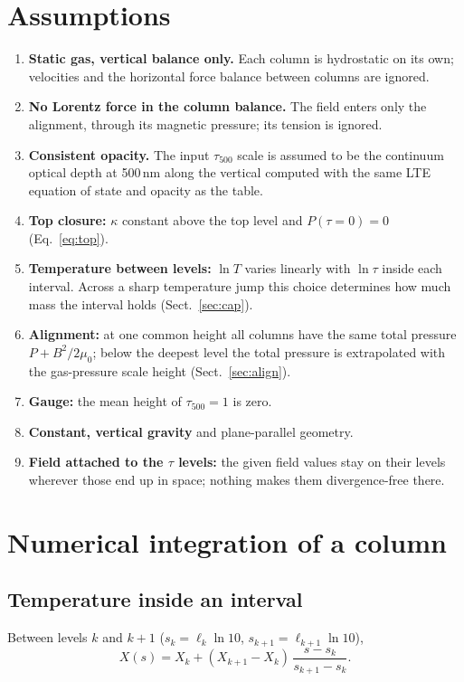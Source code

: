 \section{Assumptions}\label{sec:assume}
\begin{enumerate}[label=\textbf{A\arabic*.},leftmargin=2.2em]
\item \textbf{Static gas, vertical balance only.} Each column is hydrostatic on its own; velocities and the horizontal force
balance between columns are ignored.
\item \textbf{No Lorentz force in the column balance.} The field enters only the alignment, through its magnetic pressure;
its tension is ignored.
\item \textbf{Consistent opacity.} The input $\tau_{500}$ scale is assumed to be the continuum optical depth at 500\,nm along
the vertical computed with the same LTE equation of state and opacity as the table.
\item \textbf{Top closure:} $\kappa$ constant above the top level and $P(\tau=0)=0$ (Eq.~\ref{eq:top}).
\item \textbf{Temperature between levels:} $\ln T$ varies linearly with $\ln\tau$ inside each interval. Across a sharp
temperature jump this choice determines how much mass the interval holds (Sect.~\ref{sec:cap}).
\item \textbf{Alignment:} at one common height all columns have the same total pressure $P+B^2/2\mu_0$; below the deepest
level the total pressure is extrapolated with the gas-pressure scale height (Sect.~\ref{sec:align}).
\item \textbf{Gauge:} the mean height of $\tau_{500}=1$ is zero.
\item \textbf{Constant, vertical gravity} and plane-parallel geometry.
\item \textbf{Field attached to the $\tau$ levels:} the given field values stay on their levels wherever those end up in
space; nothing makes them divergence-free there.
\end{enumerate}

\section{Numerical integration of a column}\label{sec:num}
\subsection{Temperature inside an interval}
Between levels $k$ and $k+1$ ($s_k=\ell_k\ln10$, $s_{k+1}=\ell_{k+1}\ln10$),
\begin{equation}
X(s)=X_k+(X_{k+1}-X_k)\,\frac{s-s_k}{s_{k+1}-s_k} .
\end{equation}

